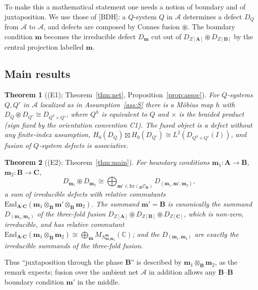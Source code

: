 \documentclass[11pt]{article}
\newtheorem{theorem}{Theorem}[section]
\theoremstyle{definition}
\theoremstyle{remark}
\newcommand{\cA}{\mathcal A}
\newcommand{\bfB}{\mathbf B}
\newcommand{\bfA}{\mathbf A}
\newcommand{\bfC}{\mathbf C}
\newcommand{\fus}{\boxtimes}
\newcommand{\cfus}{\circledast}
\begin{document}
To make this a mathematical statement one needs a notion of boundary and of juxtaposition. We use those of [BDH]: a $Q$-system $Q$ in $\cA$ determines a defect $D_Q$ from $\cA$ to $\cA$, and defects are composed by Connes fusion $\cfus$. The boundary condition $\mathbf m$ becomes the irreducible defect $D_{\mathbf m}$ cut out of $D_{Z[\bfA]}\cfus D_{Z[\bfB]}$ by the central projection labelled $\mathbf m$.

\subsection{Main results}
\begin{theorem}[(E1); Theorem~\ref{thm:net}, Proposition~\ref{prop:assoc}]\label{thm:A}
For $Q$-systems $Q,Q'$ in $\cA$ localized as in Assumption~\ref{ass:S} there is a M\"obius map $h$ with $D_Q\cfus D_{Q'}\cong D_{Q^h\times Q'}$, where $Q^h$ is equivalent to $Q$ and $\times$ is the braided product (sign fixed by the orientation convention C1). The fused object is a defect without any finite-index assumption, $H_0(D_Q)\fus H_0(D_{Q'})\cong L^2(D_{Q^h\times Q'}(I))$, and fusion of $Q$-system defects is associative.
\end{theorem}

\begin{theorem}[(E2); Theorem~\ref{thm:main}]
For boundary conditions $\mathbf m_1\colon\bfA\to\bfB$, $\mathbf m_2\colon\bfB\to\bfC$,
\[
D_{\mathbf m_1}\cfus D_{\mathbf m_2}\cong\bigoplus_{\mathbf m'\in\mathrm{Irr}({}_{\bfB}\mathcal C_{\bfB})}D_{(\mathbf m_1,\mathbf m',\mathbf m_2)},
\]
a sum of irreducible defects with relative commutants $\mathrm{End}_{\bfA\text{-}\bfC}(\mathbf m_1\otimes_{\bfB}\mathbf m'\otimes_{\bfB}\mathbf m_2)$. The summand $\mathbf m'=\bfB$ is canonically the summand $D_{(\mathbf m_1,\mathbf m_2)}$ of the three-fold fusion $D_{Z[\bfA]}\cfus D_{Z[\bfB]}\cfus D_{Z[\bfC]}$, which is non-zero, irreducible, and has relative commutant $\mathrm{End}_{\bfA\text{-}\bfC}(\mathbf m_1\otimes_{\bfB}\mathbf m_2)\cong\bigoplus_{\mathbf m}M_{N^{\mathbf m}_{\mathbf m_1\mathbf m_2}}(\mathbb C)$; and the $D_{(\mathbf m_1,\mathbf m_2)}$ are exactly the irreducible summands of the three-fold fusion.
\end{theorem}
Thus ``juxtaposition through the phase $\bfB$'' is described by $\mathbf m_1\otimes_{\bfB}\mathbf m_2$, as the remark expects; fusion over the ambient net $\cA$ in addition allows any $\bfB$--$\bfB$ boundary condition $\mathbf m'$ in the middle.
\end{document}
